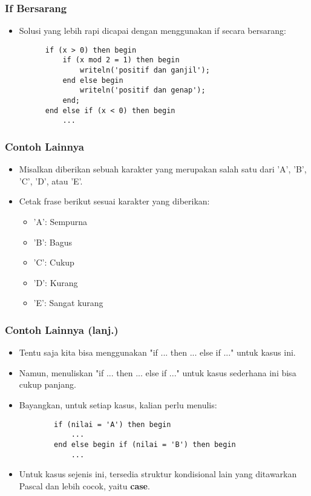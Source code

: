 \documentclass{beamer}
\begin{document}
\begin{frame}[fragile]
\frametitle{If Bersarang}
\begin{itemize}
	\item Solusi yang lebih rapi dicapai dengan menggunakan if secara bersarang:
	\begin{lstlisting}
	  if (x > 0) then begin
	      if (x mod 2 = 1) then begin
	          writeln('positif dan ganjil');
	      end else begin
	          writeln('positif dan genap');
	      end;
	  end else if (x < 0) then begin
	      ...
	\end{lstlisting}
\end{itemize}
\end{frame}

\begin{frame}
\frametitle{Contoh Lainnya}
\begin{itemize}
	\item Misalkan diberikan sebuah karakter yang merupakan salah satu dari 'A', 'B', 'C', 'D', atau 'E'.
	\item Cetak frase berikut sesuai karakter yang diberikan:
	\begin{itemize}
		\item 'A': Sempurna
		\item 'B': Bagus
		\item 'C': Cukup
		\item 'D': Kurang
		\item 'E': Sangat kurang
	\end{itemize}
\end{itemize}
\end{frame}

\begin{frame}[fragile]
\frametitle{Contoh Lainnya (lanj.)}
\begin{itemize}
	\item Tentu saja kita bisa menggunakan "if ... then ... else if ..." untuk kasus ini.
	\item Namun, menuliskan "if ... then ... else if ..." untuk kasus sederhana ini bisa cukup panjang.
	\item Bayangkan, untuk setiap kasus, kalian perlu menulis:
	\begin{lstlisting}
		if (nilai = 'A') then begin
		    ...
		end else begin if (nilai = 'B') then begin
		    ...
	\end{lstlisting}	
	\item Untuk kasus sejenis ini, tersedia struktur kondisional lain yang ditawarkan Pascal dan lebih cocok, yaitu \alert{\textbf{case}}.
\end{itemize}
\end{frame}
\end{document}
